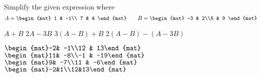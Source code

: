 
\begin{Exercise}[
name={},
title={}, 
difficulty=0,
origin={\cite{GH}}]
Simplify the given expression where
\begin{equation*}
A=\begin{mat}
1 & -1\\ 7 & 4
\end{mat}\qquad
B=\begin{mat}
-3 & 2\\5 & 9
\end{mat}
\end{equation*}
\begin{multicols}{2}
\Question $A+B$ 
\Question $2A-3B$
\Question $3(A - B)+B$
\Question $2(A - B)-(A - 3B)$ 
\EndCurrentQuestion
\end{multicols}

\end{Exercise}

\begin{Answer}
\Question $\begin{mat}-2& -1\\12 & 13\end{mat}$
\Question $\begin{mat}11& -8\\-1 & -19\end{mat}$
\Question $\begin{mat}9& -7\\11 & -6\end{mat}$
\Question $\begin{mat}-2&1\\12&13\end{mat}$
\end{Answer}
